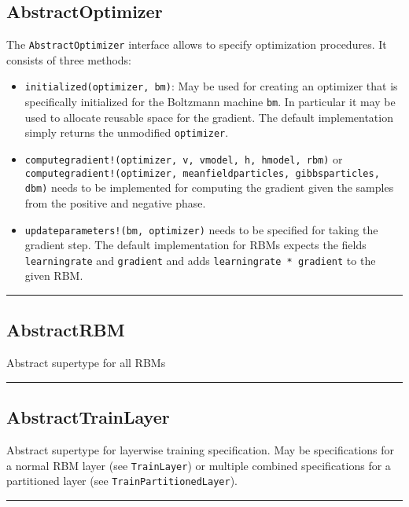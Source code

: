 \subsection*{AbstractOptimizer}  \label{bms_AbstractOptimizer}
The \texttt{AbstractOptimizer} interface allows to specify optimization procedures. It consists of three methods:

\begin{itemize}
\item \texttt{initialized(optimizer, bm)}: May be used for creating an optimizer that is  specifically initialized for the Boltzmann machine \texttt{bm}.  In particular it may be used to allocate reusable space for the gradient.  The default implementation simply returns the unmodified \texttt{optimizer}.


\item \texttt{computegradient!(optimizer, v, vmodel, h, hmodel, rbm)} or \texttt{computegradient!(optimizer, meanfieldparticles, gibbsparticles, dbm)}  needs to be implemented for computing the gradient given the samples  from the positive and negative phase.


\item \texttt{updateparameters!(bm, optimizer)} needs to be specified for taking the  gradient step. The default implementation for RBMs expects the fields  \texttt{learningrate} and \texttt{gradient} and adds \texttt{learningrate * gradient} to the  given RBM.

\end{itemize}
\noindent\rule{\textwidth}{1pt}
\subsection*{AbstractRBM}  \label{bms_AbstractRBM}
Abstract supertype for all RBMs 

\noindent\rule{\textwidth}{1pt}
\subsection*{AbstractTrainLayer}  \label{bms_AbstractTrainLayer}
Abstract supertype for layerwise training specification. May be specifications for a normal RBM layer (see \texttt{TrainLayer}) or multiple combined specifications for a partitioned layer (see \texttt{TrainPartitionedLayer}).

\noindent\rule{\textwidth}{1pt}
